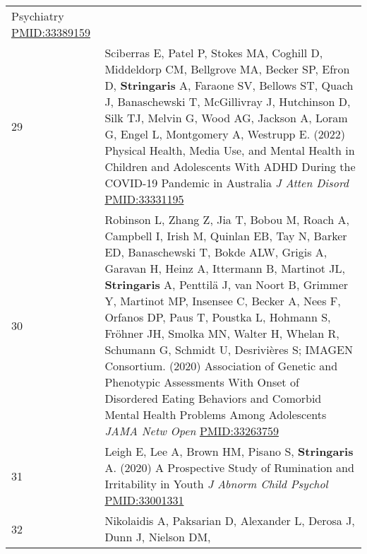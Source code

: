 \documentclass[
]{article}
\begin{document}
\begin{longtable}[]{@{}ll@{}}
\begin{minipage}[t]{0.94\columnwidth}
{Psychiatry} \url{PMID:33389159}\strut
\end{minipage}\tabularnewline
\begin{minipage}[t]{0.01\columnwidth}\raggedright
29\strut
\end{minipage} & \begin{minipage}[t]{0.94\columnwidth}\raggedright
Sciberras E, Patel P, Stokes MA, Coghill D, Middeldorp CM, Bellgrove MA,
Becker SP, Efron D, \textbf{Stringaris} A, Faraone SV, Bellows ST, Quach
J, Banaschewski T, McGillivray J, Hutchinson D, Silk TJ, Melvin G, Wood
AG, Jackson A, Loram G, Engel L, Montgomery A, Westrupp E. (2022)
Physical Health, Media Use, and Mental Health in Children and
Adolescents With ADHD During the COVID-19 Pandemic in Australia \emph{J
Atten Disord} \url{PMID:33331195}\strut
\end{minipage}\tabularnewline
\begin{minipage}[t]{0.01\columnwidth}\raggedright
30\strut
\end{minipage} & \begin{minipage}[t]{0.94\columnwidth}\raggedright
Robinson L, Zhang Z, Jia T, Bobou M, Roach A, Campbell I, Irish M,
Quinlan EB, Tay N, Barker ED, Banaschewski T, Bokde ALW, Grigis A,
Garavan H, Heinz A, Ittermann B, Martinot JL, \textbf{Stringaris} A,
Penttilä J, van Noort B, Grimmer Y, Martinot MP, Insensee C, Becker A,
Nees F, Orfanos DP, Paus T, Poustka L, Hohmann S, Fröhner JH, Smolka MN,
Walter H, Whelan R, Schumann G, Schmidt U, Desrivières S; IMAGEN
Consortium. (2020) Association of Genetic and Phenotypic Assessments
With Onset of Disordered Eating Behaviors and Comorbid Mental Health
Problems Among Adolescents \emph{JAMA Netw Open}
\url{PMID:33263759}\strut
\end{minipage}\tabularnewline
\begin{minipage}[t]{0.01\columnwidth}\raggedright
31\strut
\end{minipage} & \begin{minipage}[t]{0.94\columnwidth}\raggedright
Leigh E, Lee A, Brown HM, Pisano S, \textbf{Stringaris} A. (2020) A
Prospective Study of Rumination and Irritability in Youth \emph{J Abnorm
Child Psychol} \url{PMID:33001331}\strut
\end{minipage}\tabularnewline
\begin{minipage}[t]{0.01\columnwidth}\raggedright
32\strut
\end{minipage} & \begin{minipage}[t]{0.94\columnwidth}\raggedright
Nikolaidis A, Paksarian D, Alexander L, Derosa J, Dunn J, Nielson DM,

\end{minipage}
\end{longtable}
\end{document}
